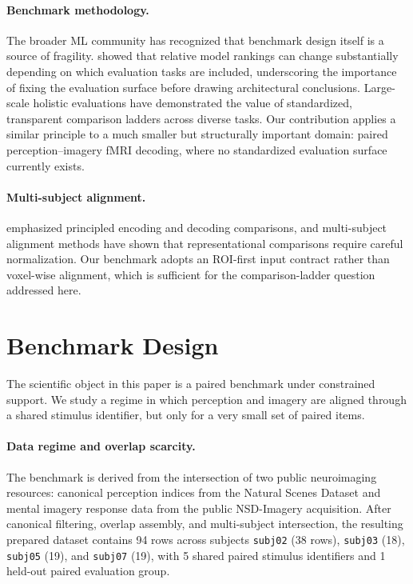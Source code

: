 \documentclass{article}
\begin{document}
\paragraph{Benchmark methodology.}
The broader ML community has recognized that benchmark design itself is a
source of fragility.  \citet{dehghani2021benchmark} showed that relative model
rankings can change substantially depending on which evaluation tasks are
included, underscoring the importance of fixing the evaluation surface before
drawing architectural conclusions.  Large-scale holistic evaluations
\citep{liang2023helm} have demonstrated the value of standardized, transparent
comparison ladders across diverse tasks.  Our contribution applies a similar
principle to a much smaller but structurally important domain: paired
perception--imagery fMRI decoding, where no standardized evaluation surface
currently exists.

\paragraph{Multi-subject alignment.}
\citet{naselaris2011encoding} emphasized principled encoding and decoding
comparisons, and multi-subject alignment methods \citep{haxby2011hyperalignment}
have shown that representational comparisons require careful normalization.  Our
benchmark adopts an ROI-first input contract rather than voxel-wise alignment,
which is sufficient for the comparison-ladder question addressed here.

\section{Benchmark Design}

The scientific object in this paper is a paired benchmark under constrained
support.  We study a regime in which perception and imagery are aligned through
a shared stimulus identifier, but only for a very small set of paired items.

\paragraph{Data regime and overlap scarcity.}
The benchmark is derived from the intersection of two public neuroimaging
resources: canonical perception indices from the Natural Scenes Dataset
\citep{allen2022nsd} and mental imagery response data from the public
NSD-Imagery acquisition.  After canonical filtering, overlap assembly, and
multi-subject intersection, the resulting prepared dataset contains 94 rows
across subjects \texttt{subj02} (38 rows), \texttt{subj03} (18),
\texttt{subj05} (19), and \texttt{subj07} (19), with 5 shared paired stimulus
identifiers and 1 held-out paired evaluation group.
\end{document}
